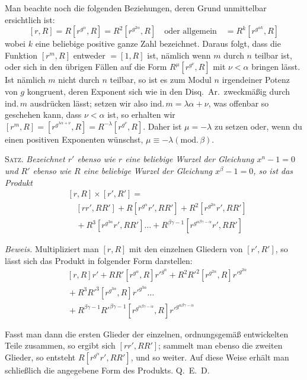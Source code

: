 Man beachte noch die folgenden Beziehungen, deren Grund unmittelbar ersichtlich ist:
\[
[r,R]=R[r^{g^\alpha},R]=R^2[r^{g^{2\alpha}},R]\quad\text{oder allgemein}\quad=R^k[r^{g^{\alpha k}},R]
\]
wobei $k$ eine beliebige positive ganze Zahl bezeichnet. Daraus folgt, dass die Funktion $[r^m,R]$ entweder $=[1,R]$ ist, nämlich wenn $m$ durch $n$ teilbar ist, oder sich in den übrigen Fällen auf die Form $R^\mu[r^{g^\nu},R]$ mit $\nu<\alpha$ bringen lässt. Ist nämlich $m$ nicht durch $n$ teilbar, so ist es zum Modul $n$ irgendeiner Potenz von $g$ kongruent, deren Exponent sich wie in den Disq.\ Ar.\ zweckmäßig durch $\mathrm{ind.}\,m$ ausdrücken lässt; setzen wir also $\mathrm{ind.}\,m=\lambda\alpha+\nu$, was offenbar so geschehen kann, dass $\nu<\alpha$ ist, so erhalten wir $[r^m,R]=[r^{g^{\lambda\alpha+\nu}},R]=R^{-\lambda}[r^{g^\nu},R]$. Daher ist $\mu=-\lambda$ zu setzen oder, wenn du einen positiven Exponenten wünschst, $\mu\equiv-\lambda(\mathrm{mod.}\,\beta)$.

\textsc{Satz.} \emph{Bezeichnet $r'$ ebenso wie $r$ eine beliebige Wurzel der Gleichung \mbox{$x^n-1=0$} und $R'$ ebenso wie $R$ eine beliebige Wurzel der Gleichung \mbox{$x^\beta-1=0$}, so ist das Produkt}
\[
\begin{aligned}
&[r,R]\times[r',R']=\\
&\quad[rr',RR']+R[r^{g^\alpha}r',RR']+R^2[r^{g^{2\alpha}}r',RR']\\
&\quad{}+R^3[r^{g^{3\alpha}}r',RR']\ldots+R^{\beta\gamma-1}[r^{g^{\alpha\beta\gamma-\alpha}}r',RR']
\end{aligned}
\]

\emph{Beweis.} Multipliziert man $[r,R]$ mit den einzelnen Gliedern von $[r',R']$, so lässt sich das Produkt in folgender Form darstellen:
\[
\begin{aligned}
&[r,R]r'+RR'[r^{g^\alpha},R]r'^{g^\alpha}+R^2R'^2[r^{g^{2\alpha}},R]r'^{g^{2\alpha}}\\
&{}+R^3R'^3[r^{g^{3\alpha}},R]r'^{g^{3\alpha}}\ldots\\
&{}+R^{\beta\gamma-1}R'^{\beta\gamma-1}[r^{g^{\alpha\beta\gamma-\alpha}},R]r'^{g^{\alpha\beta\gamma-\alpha}}
\end{aligned}
\]

Fasst man dann die ersten Glieder der einzelnen, ordnungsgemäß entwickelten Teile zusammen, so ergibt sich $[rr',RR']$; sammelt man ebenso die zweiten Glieder, so entsteht $R[r^{g^\alpha}r',RR']$, und so weiter. Auf diese Weise erhält man schließlich die angegebene Form des Produkts. Q.\ E.\ D.

